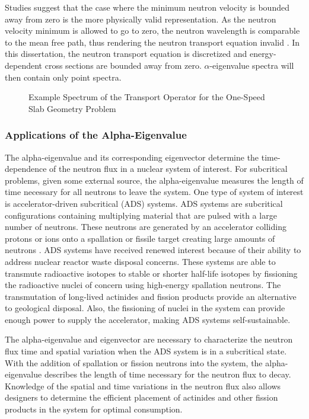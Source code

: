 Studies suggest that the case where the minimum neutron velocity is bounded away from zero is the more physically valid representation. As the neutron velocity minimum is allowed to go to zero, the neutron wavelength is comparable to the mean free path, thus rendering the neutron transport equation invalid \cite{duderstadt_nuclear_1976}. In this dissertation, the neutron transport equation is discretized and energy-dependent cross sections are bounded away from zero. $\alpha$-eigenvalue spectra will then contain only point spectra.

\begin{figure}
	\centering
	\resizebox{0.5\textwidth}{!}{

	}
	\caption{Example Spectrum of the Transport Operator for the One-Speed Slab Geometry Problem}
	\label{fig:AlphaEigSpectrum}
\end{figure}

\subsubsection{Applications of the Alpha-Eigenvalue}

The alpha-eigenvalue and its corresponding eigenvector determine the time-dependence of the neutron flux in a nuclear system of interest. For subcritical problems, given some external source, the alpha-eigenvalue measures the length of time necessary for all neutrons to leave the system. One type of system of interest is accelerator-driven subcritical (ADS) systems. ADS systems are subcritical configurations containing multiplying material that are pulsed with a large number of neutrons. These neutrons are generated by an accelerator colliding protons or ions onto a spallation or fissile target creating large amounts of neutrons \cite{abderrahim2001myrrha}. ADS systems have received renewed interest because of their ability to address nuclear reactor waste disposal concerns. These systems are able to transmute radioactive isotopes to stable or shorter half-life isotopes by fissioning the radioactive nuclei of concern using high-energy spallation neutrons. The transmutation of long-lived actinides and fission products provide an alternative to geological disposal. Also, the fissioning of nuclei in the system can provide enough power to supply the accelerator, making ADS systems self-sustainable.

The alpha-eigenvalue and eigenvector are necessary to characterize the neutron flux time and spatial variation when the ADS system is in a subcritical state. With the addition of spallation or fission neutrons into the system, the alpha-eigenvalue describes the length of time necessary for the neutron flux to decay. Knowledge of the spatial and time variations in the neutron flux also allows designers to determine the efficient placement of actinides and other fission products in the system for optimal consumption.

